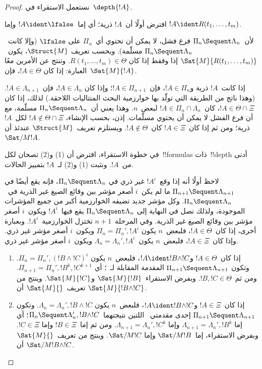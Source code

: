\documentclass[../../../include/open-logic-section]{subfiles}
\begin{document}
\begin{proof}
  نستعمل الاستقراء في~$\depth{!A}$.

افترض أولًا أن~$!A$ ذرية؛ أي إما~$!A\ident\lfalse$ وإما
$!A\ident R(t_1,\dots,t_m)$.

لأن~$\Pi_n \Sequent \Lambda_n$ فرع فشل، لا يمكن أن تحتوي أي~$\Pi_n$ على
$\lfalse$ (وإلا كانت~$\Pi_n \Sequent \Lambda_n$ مسلّمة). وبحسب تعريف
$\Struct{M}$، يكون~$\Sat{M}{R(t_1,\dots,t_m)}$ إذا وفقط إذا كان
$R(t_1,\dots,t_m)\in\Theta$. وتنتج عن الأمرين معًا العبارة: إذا كان
$!A\in\Theta$، فإن~$\Sat{M}{!A}$.

إذا كانت~$!A$ ذرية و$!A\in\Pi_n$، فإن~$!A\in\Pi_{n+1}$؛ وإذا كان
$!A\in\Lambda_n$، فإن~$!A\in\Lambda_{n+1}$. (وهذا ناتج من الطريقة التي
تولّد بها خوارزمية البحث المتتاليات اللاحقة.) لذلك، إذا كان
$!A\in\Theta\cap\Xi$، كان~$!A\in\Pi_n\cap\Lambda_n$ لبعض~$n$. وهذا يعني
أن~$\Pi_n \Sequent \Lambda_n$ مسلّمة، مع أن فرع الفشل لا يمكن أن يحتوي
مسلّمات. إذن، بحسب الإنشاء، $!A\notin\Theta\cap\Xi$ لكل~$!A$ ذرية؛ ومن ثم
إذا كان~$!A\in\Xi$ كان~$!A\notin\Theta$. ويستلزم تعريف~$\Struct{M}$ عندئذ
أن~$\Sat/{M}{!A}$.

في خطوة الاستقراء، افترض أن (1) و(2) تصحان لكل~!!{formula}s ذات~!!{depth}
أدنى من~$!A$. ونثبت (1) و(2) لـ~$!A$ بتمييز الحالات.

لاحظ أولًا أنه إذا وقع~$!A^i$ غير ذري في
$\Pi_n \Sequent \Lambda_n$، فإنه يقع أيضًا في
$\Pi_{n+1} \Sequent \Lambda_{n+1}$ ما لم يكن~$i$ أصغر مؤشر بين وقائع
الصيغ غير الذرية في~$\Pi_n \Sequent \Lambda_n$. وكل مؤشر جديد تضيفه
الخوارزمية أكبر من جميع المؤشرات الموجودة، ولذلك نصل في النهاية إلى
$\Pi_n \Sequent \Lambda_n$ يقع فيها~$!A^i$ ويكون~$i$ أصغر مؤشر بين
وقائع الصيغ غير الذرية. وفي المرحلة~$n+1$ تختزل الخوارزمية~$!A^i$.
وبعبارة أخرى، إذا كان~$!A\in\Theta$، فلبعض~$n$ يكون
$\Pi_n=\Pi_n',!A^i$ ويكون~$i$ أصغر مؤشر غير ذري. وإذا كان~$!A\in\Xi$،
فلبعض~$n$ يكون~$\Lambda_n=\Lambda_n',!A^i$ ويكون~$i$ أصغر مؤشر غير ذري.

\begin{enumerate}
  \item إذا كان~$!A\in\Theta$ و$!A\ident !B\land !C$، فلبعض~$n$ يكون
  $\Pi_n=\Pi_n',(!B\land !C)^i$. وتكون
  $\Pi_{n+1}\Sequent\Lambda_{n+1}$ المقدمة المقابلة لـ~\LeftR{\land}؛ أي
  $\Pi_{n+1}=\Pi_n',!B^k,!C^{k+1}$. ومن ثم~$!B,!C\in\Theta$. وبفرض
  الاستقراء~$\Sat{M}{!B}$ و$\Sat{M}{!C}$. وينتج من تعريف~$\Sat{M}{}$ أن
  $\Sat{M}{!B\land !C}$.

  \item إذا كان~$!A\in\Xi$ و$!A\ident !B\land !C$، فلبعض~$n$ يكون
  $\Lambda_n=\Lambda_n',!B\land !C$. وتكون
  $\Pi_{n+1}\Sequent\Lambda_{n+1}$ إحدى مقدمتي~\RightR{\land} اللتين
  نتيجتهما~$\Pi_n\Sequent\Lambda_n',!B\land !C$؛ أي إما
  $\Lambda_{n+1}=\Lambda_n',!B^k$ وإما
  $\Lambda_{n+1}=\Lambda_n',!C^k$. ومن ثم إما~$!B\in\Xi$ وإما
  $!C\in\Xi$. وبفرض الاستقراء، إما~$\Sat/{M}{!B}$ وإما
  $\Sat/{M}{!C}$. وينتج من تعريف~$\Sat{M}{}$ أن
  $\Sat/{M}{!B\land !C}$.
  

\end{enumerate}
\end{proof}
\end{document}

